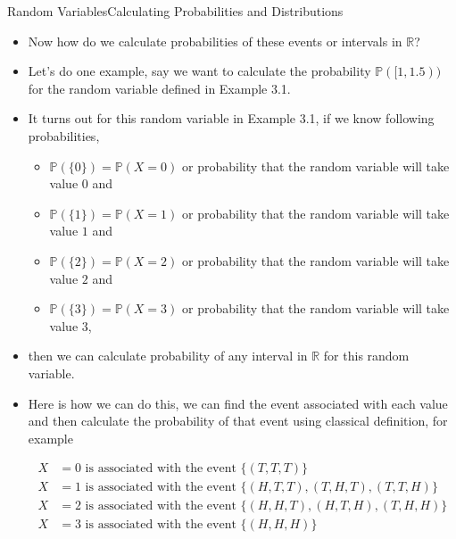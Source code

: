 \documentclass[8pt, usepdftitle=false]{beamer}
\begin{document}
\begin{frame}[allowframebreaks]{Random Variables}{Calculating Probabilities and Distributions}
\begin{itemize}
\framebreak

\item Now how do we calculate probabilities of these events or intervals in $\mathbb{R}$?


\item Let's do one example, say we want to calculate the probability $\mathbb{P}([1, 1.5))$ for the random variable defined in Example 3.1. 


\item It turns out for this random variable in Example 3.1, if we know following probabilities,

\begin{itemize}
	\item $\mathbb{P}(\{0\}) = \mathbb{P}(X = 0)$ or probability that the random variable will take value $0$ and 
	\item $\mathbb{P}(\{1\}) = \mathbb{P}(X = 1)$ or probability that the random variable will take value $1$ and
	\item $\mathbb{P}(\{2\}) = \mathbb{P}(X = 2)$ or probability that the random variable will take value $2$ and 
	\item $\mathbb{P}(\{3\}) = \mathbb{P}(X = 3)$ or probability that the random variable will take value $3$,
\end{itemize}


\item then we can calculate probability of any interval in $\mathbb{R}$ for this random variable. 

\item Here is how we can do this, we can find the event associated with each value and then calculate the probability of that event using classical definition, for example 

\begin{align*}
	 X &= 0 \text{ is associated with the event } \{ (T, T, T)\} \\
 	 X &= 1 \text{ is associated with the event } \{ (H,T,T), (T,H,T), (T,T,H)\} \\
	 X &= 2 \text{ is associated with the event } \{ (H,H,T), (H,T,H), (T,H,H)\} \\
	 X &= 3 \text{ is associated with the event } \{ (H,H,H)\}\\
\end{align*}






\end{itemize}
\end{frame}
\end{document}
